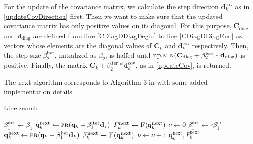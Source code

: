 For the update of the covariance matrix, we calculate the step direction $\mathbf{d}^\mathrm{cov}_k$ as in \ref{updateCovDirection} first. Then we want to make sure that the updated covariance matrix has only positive values on its diagonal. For this purpose, $\mathbf{C}_\mathrm{diag}$ and $\mathbf{d}_\mathrm{diag}$ are defined from line \ref{CDiagDDiagBegin} to line \ref{CDiagDDiagEnd} as vectors whose elements are the diagonal values of $\mathbf{C}_k$ and $\mathbf{d}^\mathrm{cov}_k$ respectively. Then, the step size $\beta^\mathrm{iter}_2$, initialized as $\beta_2$, is halfed until $\mathrm{np.}\Call{min}{\mathbf{C}_\mathrm{diag}+\beta^\mathrm{iter}_2*\mathbf{d}_\mathrm{diag}}$ is positive. Finally, the matrix $\mathbf{C}_k+\beta^\mathrm{iter}_2*\mathbf{d}^\mathrm{cov}_k$, as in \eqref{updateCov}, is returned.

The next algorithm corresponds to Algorithm 3 in \cite{Keil2022-dj} with some added implementation details.

\begin{algorithm}[H]%
\caption{\label{LineSearchAlg}Line search}
\begin{algorithmic}[1]
\State $\beta^\mathrm{iter}_1 \gets \beta_1$
\State $\mathbf{q}^\mathrm{next}_k \gets \Call{pr}{\mathbf{q}_k+\beta^\mathrm{iter}_1\mathbf{d}_k}$
\State \label{LineSearchAlgFOMCall1}$F^\mathrm{next}_k \gets \Call{F}{\mathbf{q}^\mathrm{next}_k}$
\State $\nu \gets 0$
\State $\beta^\mathrm{iter}_1 \gets r\beta^\mathrm{iter}_1$
\State $\mathbf{q}^\mathrm{next}_k \gets \Call{pr}{\mathbf{q}_k+\beta^\mathrm{iter}_1\mathbf{d}_k}$
\State \label{LineSearchAlgFOMCall2}$F^\mathrm{next}_k \gets \Call{F}{\mathbf{q}^\mathrm{next}_k}$
\State $\nu \gets \nu+1$
\EndWhile
\State\Return $\mathbf{q}^\mathrm{next}_k, F^\mathrm{next}_k$
\EndFunction
\end{algorithmic}
\end{algorithm}

